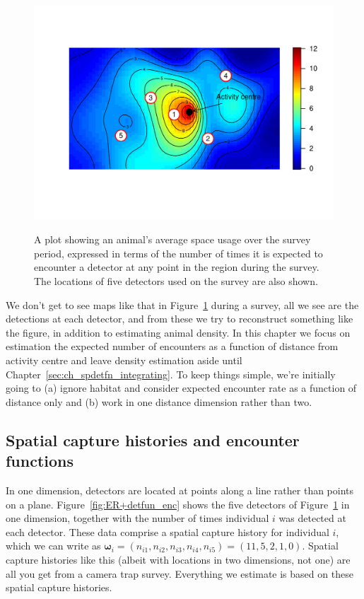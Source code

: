 \begin{figure}[ht]
\caption{\small A plot showing an animal's average space usage over the survey period, expressed in terms of the number of times it is expected to encounter a detector at any point in the region during the survey. The locations of five detectors used on the survey are also shown.}
\centering
\vspace{-24pt}
\includegraphics[width=12cm]{keepfigure/usage.pdf}
\label{fig:ER+detfun_habitat_encrate}
\end{figure}

We don't get to see maps like that in Figure~\ref{fig:ER+detfun_habitat_encrate} during a survey, all we see are the detections at each detector, and from these we try to reconstruct something like the figure, in addition to estimating animal density. In this chapter we focus on estimation the expected number of encounters as a function of distance from activity centre and leave density estimation aside until Chapter~\ref{sec:ch_spdetfn_integrating}. To keep things simple, we're initially going to (a) ignore habitat and consider expected encounter rate as a function of distance only and (b) work in one distance dimension rather than two. 

\subsection{Spatial capture histories and encounter functions}
\label{subsec:ER+detfun.spatialCH}

In one dimension, detectors are located at points along a line rather than points on a plane. Figure~\ref{fig:ER+detfun_enc} shows the five detectors of Figure~\ref{fig:ER+detfun_habitat_encrate} in one dimension, together with the number of times individual $i$ was detected at each detector. These data comprise a spatial capture history for individual $i$, which we can write as $\bm{\omega}_i=(n_{i1},n_{i2},n_{i3},n_{i4},n_{i5})=(11,5,2,1,0)$. Spatial capture histories like this (albeit with locations in two dimensions, not one) are all you get from a camera trap survey. Everything we estimate is based on these spatial capture histories.


